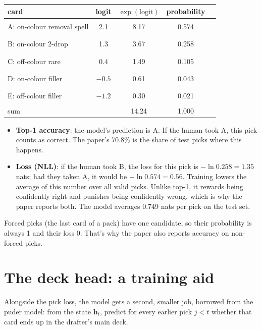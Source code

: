 \documentclass[11pt,letterpaper]{article}
\begin{document}
\begin{center}\small
\begin{tabular}{lcccc}
\toprule
card & logit & $\exp(\text{logit})$ & probability & \\
\midrule
A: on-colour removal spell & 2.1 & 8.17 & 0.574 & \textcolor{cblue}{\rule{2.87cm}{6pt}} \\
B: on-colour 2-drop & 1.3 & 3.67 & 0.258 & \textcolor{cblue}{\rule{1.29cm}{6pt}} \\
C: off-colour rare & 0.4 & 1.49 & 0.105 & \textcolor{cblue}{\rule{0.52cm}{6pt}} \\
D: on-colour filler & $-0.5$ & 0.61 & 0.043 & \textcolor{cblue}{\rule{0.21cm}{6pt}} \\
E: off-colour filler & $-1.2$ & 0.30 & 0.021 & \textcolor{cblue}{\rule{0.11cm}{6pt}} \\
\midrule
sum & & 14.24 & 1.000 & \\
\bottomrule
\end{tabular}
\end{center}

\begin{itemize}
\item \textbf{Top-1 accuracy}: the model's prediction is A. If the human took A, this pick counts as
correct. The paper's 70.8\% is the share of test picks where this happens.
\item \textbf{Loss (NLL)}: if the human took B, the loss for this pick is $-\ln 0.258 = 1.35$ nats; had
they taken A, it would be $-\ln 0.574 = 0.56$. Training lowers the average of this number over all valid
picks. Unlike top-1, it rewards being confidently right and punishes being confidently wrong, which is why
the paper reports both. The model averages 0.749 nats per pick on the test set.
\end{itemize}

Forced picks (the last card of a pack) have one candidate, so their probability is always 1 and their
loss 0. That's why the paper also reports accuracy on non-forced picks.

\section{The deck head: a training aid}

Alongside the pick loss, the model gets a second, smaller job, borrowed from the puder model: from the
state $\mathbf{h}_t$, predict for every earlier pick $j<t$ whether that card ends up in the drafter's main
deck.
\end{document}
